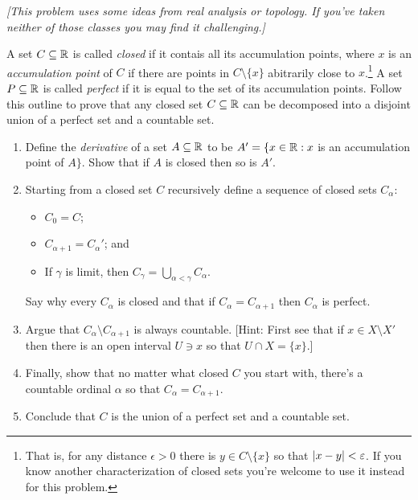\documentclass[10pt]{amsart}
\begin{document}
\begin{problem}
\emph{[This problem uses some ideas from real analysis or topology. If you've taken neither of those classes you may find it challenging.]}

A set $C \subseteq \mathbb{R}$ is called \emph{closed} if it contais all its accumulation points, where $x$ is an \emph{accumulation point} of $C$ if there are points in $C \setminus \{x\}$ abitrarily close to $x$.\footnote{That is, for any distance $\epsilon > 0$ there is $y \in C \setminus \{x\}$ so that $\left\lvert x - y \right\rvert < \varepsilon$. If you know another characterization of closed sets you're welcome to use it instead for this problem.}
A set $P \subseteq \mathbb{R}$ is called \emph{perfect} if it is equal to the set of its accumulation points. Follow this outline to prove that any closed set $C \subseteq \mathbb{R}$ can be decomposed into a disjoint union of a perfect set and a countable set.
\begin{enumerate}
\item Define the \emph{derivative} of a set $A \subseteq \mathbb{R}$ to be $A' = \{ x \in \mathbb{R} : x$ is an accumulation point of $A\}$. Show that if $A$ is closed then so is $A'$.
\item Starting from a closed set $C$ recursively define a sequence of closed sets $C_\alpha$:
  \begin{itemize}
  \item $C_0 = C$;
  \item $C_{\alpha+1} = C_\alpha'$; and
  \item If $\gamma$ is limit, then $C_\gamma = \bigcup_{\alpha < \gamma} C_\alpha$.
  \end{itemize}
Say why every $C_\alpha$ is closed and that if $C_\alpha = C_{\alpha+1}$ then $C_\alpha$ is perfect.
\item Argue that $C_\alpha \setminus C_{\alpha+1}$ is always countable. [Hint: First see that if $x \in X \setminus X'$ then there is an open interval $U \ni x$ so that $U \cap X = \{x\}$.]
\item Finally, show that no matter what closed $C$ you start with, there's a countable ordinal $\alpha$ so that $C_\alpha = C_{\alpha+1}$.
\item Conclude that $C$ is the union of a perfect set and a countable set.
\end{enumerate}
\end{problem}
\end{document}
